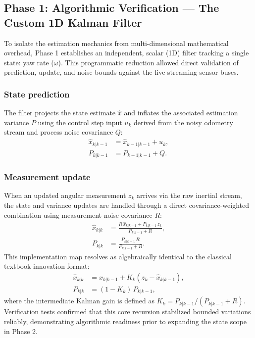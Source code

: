\subsection{Phase 1: Algorithmic Verification --- The Custom 1D Kalman Filter}
\label{subsec:kf_theory}

To isolate the estimation mechanics from multi-dimensional mathematical overhead, Phase 1 establishes an independent, scalar (1D) filter tracking a single state: yaw rate ($\omega$). This programmatic reduction allowed direct validation of prediction, update, and noise bounds against the live streaming sensor buses. 

\subsubsection{State prediction}

The filter projects the state estimate $\hat{x}$ and inflates the associated estimation variance $P$ using the control step input $u_k$ derived from the noisy odometry stream and process noise covariance $Q$:
\begin{align}
\hat{x}_{k|k-1} &= \hat{x}_{k-1|k-1} + u_k, \label{eq:kf_predict_mean}\\
P_{k|k-1} &= P_{k-1|k-1} + Q. \label{eq:kf_predict_var}
\end{align}

\subsubsection{Measurement update}

When an updated angular measurement $z_k$ arrives via the raw inertial stream, the state and variance updates are handled through a direct covariance-weighted combination using measurement noise covariance $R$:
\begin{align}
\hat{x}_{k|k} &= \frac{R\,\hat{x}_{k|k-1} + P_{k|k-1}\,z_k}{P_{k|k-1} + R}, \label{eq:kf_update_mean}\\
P_{k|k} &= \frac{P_{k|k-1}\,R}{P_{k|k-1} + R}. \label{eq:kf_update_var}
\end{align}
This implementation map resolves as algebraically identical to the classical textbook innovation format:
\begin{align}
\hat{x}_{k|k} &= \hat{x}_{k|k-1} + K_k\left(z_k - \hat{x}_{k|k-1}\right), \\
P_{k|k} &= (1 - K_k)\,P_{k|k-1},
\end{align}
where the intermediate Kalman gain is defined as $K_k = P_{k|k-1} / (P_{k|k-1} + R)$. Verification tests confirmed that this core recursion stabilized bounded variations reliably, demonstrating algorithmic readiness prior to expanding the state scope in Phase 2.

